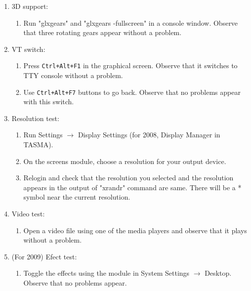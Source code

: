\documentclass[a4paper,10pt]{article}
\begin{document}
\begin{itemize}
\begin{enumerate}
  \item 3D support:
    \begin{enumerate}
    \item Run "glxgears" and "glxgears -fullscreen" in a console window. Observe that three rotating gears appear without a problem.
    \end{enumerate}

  \item VT switch:
    \begin{enumerate}
    \item Press \texttt{Ctrl+Alt+F1} in the graphical screen. Observe that it switches to TTY console without a problem.
    \item Use \texttt{Ctrl+Alt+F7} buttons to go back. Observe that no problems appear with this switch.
    \end{enumerate}

  \item Resolution test:
    \begin{enumerate}
    \item Run Settings $\rightarrow$ Display Settings (for 2008, Display Manager in TASMA).
    \item On the screens module, choose a resolution for your output device.
    \item Relogin and check that the resolution you selected and the resolution appears in the output of "xrandr" command are same.
          There will be a * symbol near the current resolution.
    \end{enumerate}
 
  \item Video test:
    \begin{enumerate}
    \item Open a video file using one of the media players and observe that it plays without a problem.
    \end{enumerate}
 
  \item (For 2009) Efect test:
    \begin{enumerate}
    \item Toggle the effects using the module in System Settings $\rightarrow$ Desktop. Observe that no problems appear.
    \end{enumerate}
  \end{enumerate}
\end{itemize}
\end{document}
